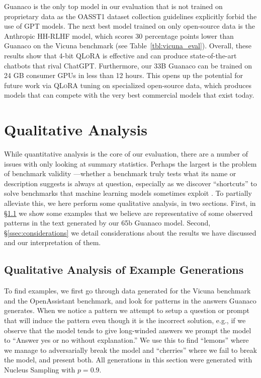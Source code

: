 {Guanaco} is the only top model in our evaluation that is not trained on proprietary data as the OASST1 dataset collection guidelines explicitly forbid the use of GPT models. The next best model trained on only open-source data is the Anthropic HH-RLHF model, which scores 30 percentage points lower than {Guanaco} on the Vicuna benchmark (see Table~\ref{tbl:vicuna_eval}). Overall, these results show that 4-bit \textsc{QLoRA} is effective and can produce state-of-the-art chatbots that rival ChatGPT. Furthermore, our 33B {Guanaco} can be trained on 24 GB consumer GPUs in less than 12 hours. This opens up the potential for future work via \textsc{QLoRA} tuning on specialized open-source data, which produces models that can compete with the very best commercial models that exist today. 

\section{Qualitative Analysis}

While quantitative analysis is the core of our evaluation, there are a number of issues with only looking at summary statistics. Perhaps the largest is the problem of benchmark validity \citep{liao2021we}—whether a benchmark truly tests what its name or description suggests is always at question, especially as we discover ``shortcuts'' to solve benchmarks that machine learning models sometimes exploit \citep{gururangan2018annotation, poliak2018hypothesis}. To partially alleviate this, we here perform some qualitative analysis, in two sections. First, in \S\ref{ssec:examples} we show some examples that we believe are representative of some observed patterns in the text generated by our 65b {Guanaco} model. Second, \S\ref{ssec:considerations} we detail considerations about the results we have discussed and our interpretation of them.

\subsection{Qualitative Analysis of Example Generations}
\label{ssec:examples}

To find examples, we first go through data generated for the Vicuna benchmark and the OpenAssistant benchmark, and look for patterns in the answers {Guanaco} generates. When we notice a pattern we attempt to setup a question or prompt that will induce the pattern even though it is the incorrect solution, e.g., if we observe that the model tends to give long-winded answers we prompt the model to ``Answer yes or no without explanation.'' We use this to find ``lemons'' where we manage to adversarially break the model and ``cherries'' where we fail to break the model, and present both. All generations in this section were generated with Nucleus Sampling \cite{holtzmancurious} with $p=0.9$.

